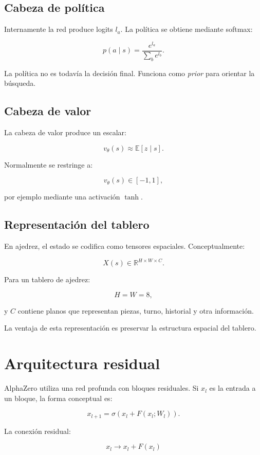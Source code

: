 \documentclass[11pt,a4paper]{article}
\newcommand{\E}{\mathbb{E}}
\newcommand{\R}{\mathbb{R}}
\begin{document}
\subsection{Cabeza de política}

Internamente la red produce logits \(l_a\). La política se obtiene mediante softmax:

\[
p(a\mid s)
=
\frac{e^{l_a}}
{\sum_b e^{l_b}}.
\]

La política no es todavía la decisión final. Funciona como \emph{prior} para orientar la búsqueda.

\subsection{Cabeza de valor}

La cabeza de valor produce un escalar:

\[
v_\theta(s)
\approx
\E[z\mid s].
\]

Normalmente se restringe a:

\[
v_\theta(s)\in[-1,1],
\]

por ejemplo mediante una activación \(\tanh\).

\subsection{Representación del tablero}

En ajedrez, el estado se codifica como tensores espaciales. Conceptualmente:

\[
X(s)\in\R^{H\times W\times C}.
\]

Para un tablero de ajedrez:

\[
H=W=8,
\]

y \(C\) contiene planos que representan piezas, turno, historial y otra información.

La ventaja de esta representación es preservar la estructura espacial del tablero.

\section{Arquitectura residual}

AlphaZero utiliza una red profunda con bloques residuales. Si \(x_l\) es la entrada a un bloque, la forma conceptual es:

\[
x_{l+1}
=
\sigma\left(
x_l + F(x_l;W_l)
\right).
\]

La conexión residual:

\[
x_l \rightarrow x_l + F(x_l)
\]
\end{document}
